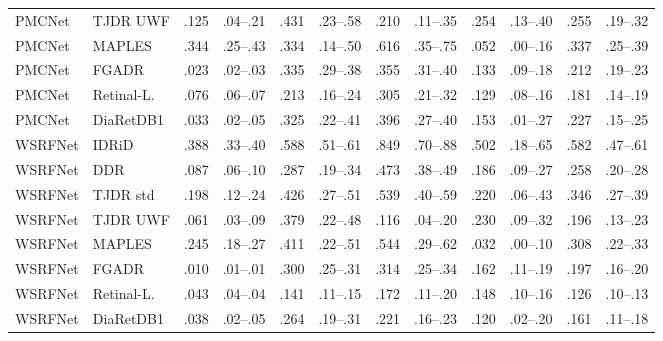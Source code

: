 \begin{landscape}
{\begin{longtable}{l l c c c c c c c c c c}
PMCNet & TJDR UWF & .125 & \scriptsize .04--.21 & .431 & \scriptsize .23--.58 & .210 & \scriptsize .11--.35 & .254 & \scriptsize .13--.40 & .255 & \scriptsize .19--.32 \\
PMCNet & MAPLES & .344 & \scriptsize .25--.43 & .334 & \scriptsize .14--.50 & .616 & \scriptsize .35--.75 & .052 & \scriptsize .00--.16 & .337 & \scriptsize .25--.39 \\
PMCNet & FGADR & .023 & \scriptsize .02--.03 & .335 & \scriptsize .29--.38 & .355 & \scriptsize .31--.40 & .133 & \scriptsize .09--.18 & .212 & \scriptsize .19--.23 \\
PMCNet & Retinal-L. & .076 & \scriptsize .06--.07 & .213 & \scriptsize .16--.24 & .305 & \scriptsize .21--.32 & .129 & \scriptsize .08--.16 & .181 & \scriptsize .14--.19 \\
PMCNet & DiaRetDB1 & .033 & \scriptsize .02--.05 & .325 & \scriptsize .22--.41 & .396 & \scriptsize .27--.40 & .153 & \scriptsize .01--.27 & .227 & \scriptsize .15--.25 \\
WSRFNet & IDRiD & .388 & \scriptsize .33--.40 & .588 & \scriptsize .51--.61 & .849 & \scriptsize .70--.88 & .502 & \scriptsize .18--.65 & .582 & \scriptsize .47--.61 \\
WSRFNet & DDR & .087 & \scriptsize .06--.10 & .287 & \scriptsize .19--.34 & .473 & \scriptsize .38--.49 & .186 & \scriptsize .09--.27 & .258 & \scriptsize .20--.28 \\
WSRFNet & TJDR std & .198 & \scriptsize .12--.24 & .426 & \scriptsize .27--.51 & .539 & \scriptsize .40--.59 & .220 & \scriptsize .06--.43 & .346 & \scriptsize .27--.39 \\
WSRFNet & TJDR UWF & .061 & \scriptsize .03--.09 & .379 & \scriptsize .22--.48 & .116 & \scriptsize .04--.20 & .230 & \scriptsize .09--.32 & .196 & \scriptsize .13--.23 \\
WSRFNet & MAPLES & .245 & \scriptsize .18--.27 & .411 & \scriptsize .22--.51 & .544 & \scriptsize .29--.62 & .032 & \scriptsize .00--.10 & .308 & \scriptsize .22--.33 \\
WSRFNet & FGADR & .010 & \scriptsize .01--.01 & .300 & \scriptsize .25--.31 & .314 & \scriptsize .25--.34 & .162 & \scriptsize .11--.19 & .197 & \scriptsize .16--.20 \\
WSRFNet & Retinal-L. & .043 & \scriptsize .04--.04 & .141 & \scriptsize .11--.15 & .172 & \scriptsize .11--.20 & .148 & \scriptsize .10--.16 & .126 & \scriptsize .10--.13 \\
WSRFNet & DiaRetDB1 & .038 & \scriptsize .02--.05 & .264 & \scriptsize .19--.31 & .221 & \scriptsize .16--.23 & .120 & \scriptsize .02--.20 & .161 & \scriptsize .11--.18 \\

\end{longtable}}
\end{landscape}
